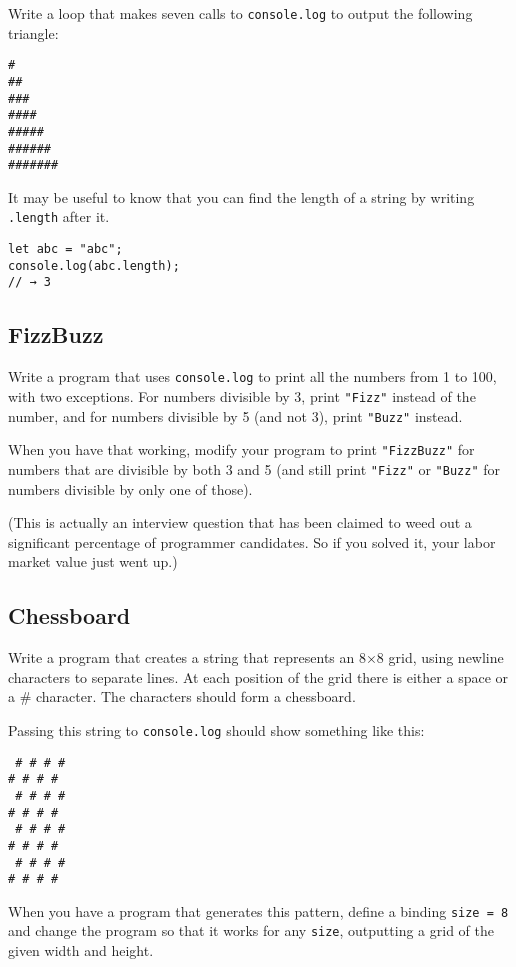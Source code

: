 Write a loop that makes seven calls to \lstinline`console.log` to output the following triangle:

\begin{lstlisting}
#
##
###
####
#####
######
#######
\end{lstlisting}
\noindent{}

It may be useful to know that you can find the length of a string by writing \lstinline`.length` after it.

\begin{lstlisting}
let abc = "abc";
console.log(abc.length);
// → 3
\end{lstlisting}
\noindent

\subsection{FizzBuzz}

Write a program that uses \lstinline`console.log` to print all the numbers from 1 to 100, with two exceptions. For numbers divisible by 3, print \lstinline`"Fizz"` instead of the number, and for numbers divisible by 5 (and not 3), print \lstinline`"Buzz"` instead.

When you have that working, modify your program to print \lstinline`"FizzBuzz"` for numbers that are divisible by both 3 and 5 (and still print \lstinline`"Fizz"` or \lstinline`"Buzz"` for numbers divisible by only one of those).

(This is actually an interview question that has been claimed to weed out a significant percentage of programmer candidates. So if you solved it, your labor market value just went up.)

\subsection{Chessboard}

Write a program that creates a string that represents an 8×8 grid, using newline characters to separate lines. At each position of the grid there is either a space or a \textquotedbl{}\#\textquotedbl{} character. The characters should form a chessboard.

Passing this string to \lstinline`console.log` should show something like this:

\begin{lstlisting}
 # # # #
# # # # 
 # # # #
# # # # 
 # # # #
# # # # 
 # # # #
# # # #
\end{lstlisting}
\noindent

When you have a program that generates this pattern, define a binding \lstinline`size = 8` and change the program so that it works for any \lstinline`size`, outputting a grid of the given width and height.
